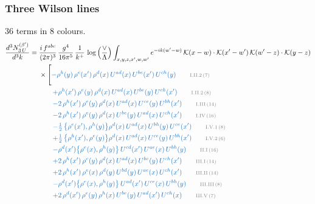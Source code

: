 \documentclass[10pt]{article}
\begin{document}
\subsubsection{Three Wilson lines}
36 terms in 8 colours.
\begin{align}
\frac{d^{3}N^{(\beta')}_{3\,U}}{d^{3}k}={}&\frac{i\,f^{abc}}{(2\pi)^{3}}\,\frac{g^{4}}{16\pi^{5}}\,\frac{1}{k^{+}}\,\log\Big(\frac{\vee}{\Lambda}\Big)\int_{x,y,z,x',w,w'}e^{-ik(w'-w)}\,\mathcal{K}(x-w)\cdot\mathcal{K}(x'-w')\,\mathcal{K}(w'-z)\cdot\mathcal{K}(y-z)\notag\\
&\times\Bigg[{\color{RoyalBlue}-\rho^{h}(y)\,\rho^{e}(x')\,\rho^{d}(x)\,U^{ad}(x)\,U^{be}(x')\,U^{ch}(y)}\tag*{\color{gray}\scriptsize I.II.2\,(7)}\\
&\qquad{\color{RoyalBlue}+\rho^{h}(x')\,\rho^{e}(y)\,\rho^{d}(x)\,U^{ad}(x)\,U^{be}(y)\,U^{ch}(x')}\tag*{\color{gray}\scriptsize I.II.2\,(8)}\\
&\qquad{\color{RoyalBlue}-2\,\rho^{h}(x')\,\rho^{e}(y)\,\rho^{d}(x)\,U^{ad}(x)\,U^{ce}(y)\,U^{bh}(x')}\tag*{\color{gray}\scriptsize I.III\,(14)}\\
&\qquad{\color{RoyalBlue}-2\,\rho^{h}(x')\,\rho^{e}(y)\,\rho^{d}(x)\,U^{be}(y)\,U^{ad}(x)\,U^{ch}(x')}\tag*{\color{gray}\scriptsize I.IV\,(16)}\\
&\qquad{\color{RoyalBlue}-\tfrac{1}{2}\,\big\{\rho^{e}(x'),\rho^{h}(y)\big\}\rho^{d}(x)\,U^{ad}(x)\,U^{bh}(y)\,U^{ce}(x')}\tag*{\color{gray}\scriptsize I.V.1\,(8)}\\
&\qquad{\color{RoyalBlue}+\tfrac{1}{2}\,\big\{\rho^{h}(x'),\rho^{e}(y)\big\}\rho^{d}(x)\,U^{ad}(x)\,U^{ce}(y)\,U^{bh}(x')}\tag*{\color{gray}\scriptsize I.V.2\,(6)}\\
&\qquad{\color{RoyalBlue}-\rho^{d}(x')\big\{\rho^{e}(x),\rho^{h}(y)\big\}\,U^{cd}(x')\,U^{ae}(x)\,U^{bh}(y)}\tag*{\color{gray}\scriptsize II.I\,(16)}\\
&\qquad{\color{RoyalBlue}+2\,\rho^{h}(x')\,\rho^{e}(y)\,\rho^{d}(x)\,U^{ad}(x)\,U^{be}(y)\,U^{ch}(x')}\tag*{\color{gray}\scriptsize III.I\,(14)}\\
&\qquad{\color{RoyalBlue}+2\,\rho^{h}(x')\,\rho^{e}(x)\,\rho^{d}(y)\,U^{bd}(y)\,U^{ae}(x)\,U^{ch}(x')}\tag*{\color{gray}\scriptsize III.II\,(14)}\\
&\qquad{\color{RoyalBlue}-\rho^{d}(x')\big\{\rho^{e}(x),\rho^{h}(y)\big\}\,U^{ad}(x')\,U^{ce}(x)\,U^{bh}(y)}\tag*{\color{gray}\scriptsize III.III\,(8)}\\
&\qquad{\color{RoyalBlue}+2\,\rho^{d}(x')\,\rho^{e}(y)\, \rho^{h}(x)\,U^{be}(y)\,U^{ad}(x')\,U^{ch}(x)}\tag*{\color{gray}\scriptsize III.V\,(7)}\\

\end{align}
\end{document}
